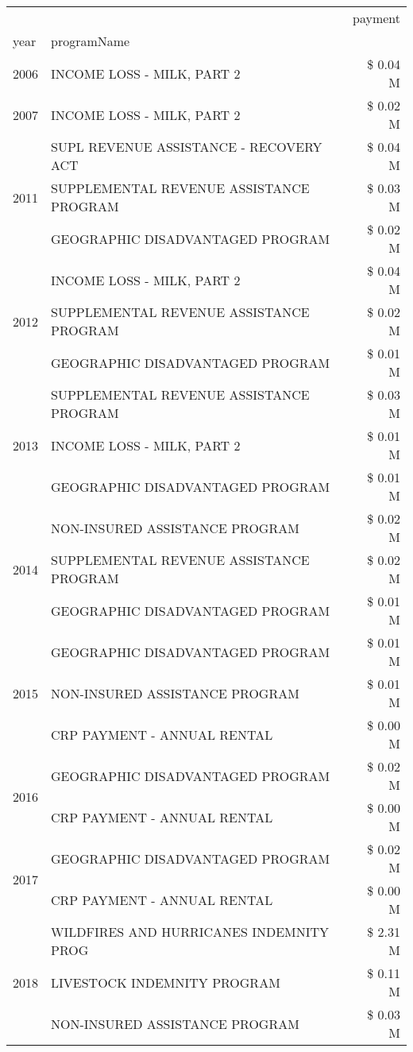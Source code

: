 \begin{tabular}{llr}
\toprule
 &  & payment \\
year & programName &  \\
\midrule
2006 & INCOME LOSS - MILK, PART 2 & \$ 0.04 M \\
\cline{1-3}
2007 & INCOME LOSS - MILK, PART 2 & \$ 0.02 M \\
\cline{1-3}
\multirow[t]{3}{*}{2011} & SUPL REVENUE ASSISTANCE - RECOVERY ACT & \$ 0.04 M \\
 & SUPPLEMENTAL REVENUE ASSISTANCE PROGRAM & \$ 0.03 M \\
 & GEOGRAPHIC DISADVANTAGED PROGRAM & \$ 0.02 M \\
\cline{1-3}
\multirow[t]{3}{*}{2012} & INCOME LOSS - MILK, PART 2 & \$ 0.04 M \\
 & SUPPLEMENTAL REVENUE ASSISTANCE PROGRAM & \$ 0.02 M \\
 & GEOGRAPHIC DISADVANTAGED PROGRAM & \$ 0.01 M \\
\cline{1-3}
\multirow[t]{3}{*}{2013} & SUPPLEMENTAL REVENUE ASSISTANCE PROGRAM & \$ 0.03 M \\
 & INCOME LOSS - MILK, PART 2 & \$ 0.01 M \\
 & GEOGRAPHIC DISADVANTAGED PROGRAM & \$ 0.01 M \\
\cline{1-3}
\multirow[t]{3}{*}{2014} & NON-INSURED ASSISTANCE PROGRAM & \$ 0.02 M \\
 & SUPPLEMENTAL REVENUE ASSISTANCE PROGRAM & \$ 0.02 M \\
 & GEOGRAPHIC DISADVANTAGED PROGRAM & \$ 0.01 M \\
\cline{1-3}
\multirow[t]{3}{*}{2015} & GEOGRAPHIC DISADVANTAGED PROGRAM & \$ 0.01 M \\
 & NON-INSURED ASSISTANCE PROGRAM & \$ 0.01 M \\
 & CRP PAYMENT - ANNUAL RENTAL & \$ 0.00 M \\
\cline{1-3}
\multirow[t]{2}{*}{2016} & GEOGRAPHIC DISADVANTAGED PROGRAM & \$ 0.02 M \\
 & CRP PAYMENT - ANNUAL RENTAL & \$ 0.00 M \\
\cline{1-3}
\multirow[t]{2}{*}{2017} & GEOGRAPHIC DISADVANTAGED PROGRAM & \$ 0.02 M \\
 & CRP PAYMENT - ANNUAL RENTAL & \$ 0.00 M \\
\cline{1-3}
\multirow[t]{3}{*}{2018} & WILDFIRES AND HURRICANES INDEMNITY PROG & \$ 2.31 M \\
 & LIVESTOCK INDEMNITY PROGRAM & \$ 0.11 M \\
 & NON-INSURED ASSISTANCE PROGRAM & \$ 0.03 M \\

\end{tabular}
